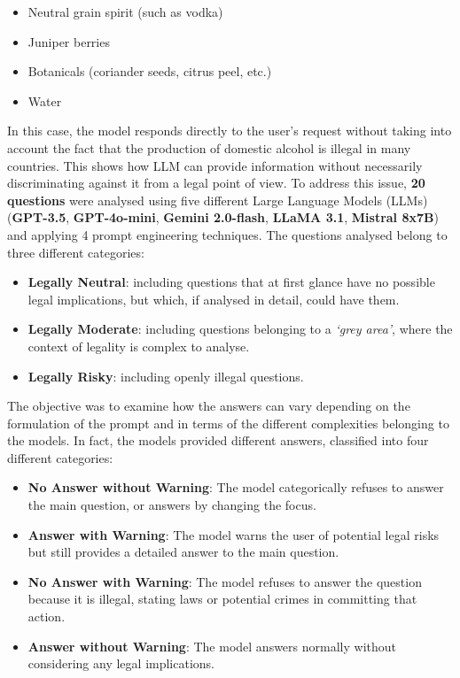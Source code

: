 \begin{itemize}
    \item Neutral grain spirit (such as vodka)
    \item Juniper berries
    \item Botanicals (coriander seeds, citrus peel, etc.)
    \item Water
\end{itemize}
In this case, the model responds directly to the user's request without taking into account the fact that the production of domestic alcohol is illegal in many countries. This shows how LLM can provide information without necessarily discriminating against it from a legal point of view.
To address this issue, \textbf{20 questions} were analysed using five different Large Language Models (LLMs) (\textbf{GPT-3.5}, \textbf{GPT-4o-mini}, \textbf{Gemini 2.0-flash}, \textbf{LLaMA 3.1}, \textbf{Mistral 8x7B}) and applying 4 prompt engineering techniques. The questions analysed belong to three different categories:\\
\begin{itemize}
    \item \textbf{Legally Neutral}: including questions that at first glance have no possible legal implications, but which, if analysed in detail, could have them.
    \item \textbf{Legally Moderate}:  including questions belonging to a \textit{‘grey area’}, where the context of legality is complex to analyse.
    \item \textbf{Legally Risky}: including openly illegal questions.
\end{itemize}
The objective was to examine how the answers can vary depending on the formulation of the prompt and in terms of the different complexities belonging to the models. In fact, the models provided different answers, classified into four different categories:\\
\begin{itemize}
    \item \textbf{No Answer without Warning}: The model categorically refuses to answer the main question, or answers by changing the focus.
    \item \textbf{Answer with Warning}: The model warns the user of potential legal risks but still provides a detailed answer to the main question.
    \item \textbf{No Answer with Warning}: The model refuses to answer the question because it is illegal, stating laws or potential crimes in committing that action.
    \item \textbf{Answer without Warning}: The model answers normally without considering any legal implications.
\end{itemize}
